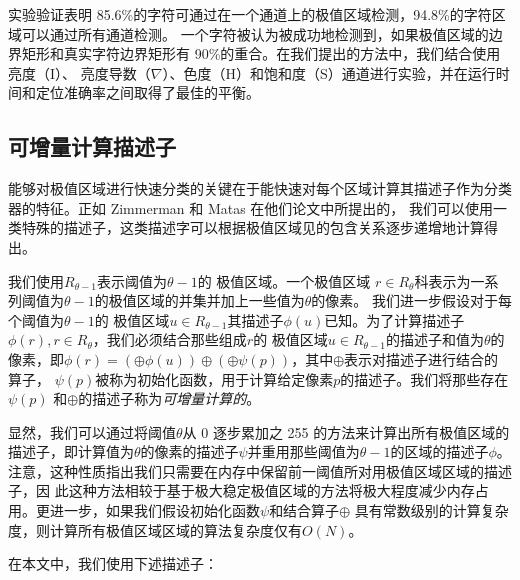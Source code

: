 \documentclass[UTF8]{ctexart}
\begin{document}
实验验证表明 85.6\%的字符可通过在一个通道上的极值区域检测，94.8\%的字符区域可以通过所有通道检测。
一个字符被认为被成功地检测到，如果极值区域的边界矩形和真实字符边界矩形有 90\%的重合。在我们提出的方法中，我们结合使用亮度（I）、
亮度导数（$\nabla$）、色度（H）和饱和度（S）通道进行实验，并在运行时间和定位准确率之间取得了最佳的平衡。

\subsection{可增量计算描述子}

能够对极值区域进行快速分类的关键在于能快速对每个区域计算其描述子作为分类器的特征。正如 Zimmerman 和 Matas 在他们论文中所提出的，
我们可以使用一类特殊的描述子，这类描述字可以根据极值区域见的包含关系逐步递增地计算得出。

我们使用$R_{\theta-1}$表示阈值为$\theta-1$的 极值区域。一个极值区域 $r \in R_{\theta}$科表示为一系列阈值为$\theta-1$的极值区域的并集并加上一些值为$\theta$的像素。
我们进一步假设对于每个阈值为$\theta-1$的 极值区域$u \in R_{\theta-1}$其描述子$\phi(u)$已知。为了计算描述子$\phi(r), r \in R_{\theta}$，我们必须结合那些组成$r$的
极值区域$u \in R_{\theta-1}$的描述子和值为$\theta$的像素，即$\phi(r) = \left( \oplus{\phi(u)} \right) \oplus \left( \oplus{\psi(p)} \right)$，其中$\oplus$表示对描述子进行结合的算子，
$\psi(p)$被称为初始化函数，用于计算给定像素$p$的描述子。我们将那些存在$\psi(p)$
和$\oplus$的描述子称为\textit{可增量计算的}。

显然，我们可以通过将阈值$\theta$从 0 逐步累加之 255 的方法来计算出所有极值区域的描述子，即计算值为$\theta$的像素的描述子$\psi$并重用那些阈值为$\theta-1$的区域的描述子$\phi$。
注意，这种性质指出我们只需要在内存中保留前一阈值所对用极值区域区域的描述子，因
此这种方法相较于基于极大稳定极值区域的方法将极大程度减少内存占用。更进一步，如果我们假设初始化函数$\psi$和结合算子$\oplus$
具有常数级别的计算复杂度，则计算所有极值区域区域的算法复杂度仅有$O(N)$。

在本文中，我们使用下述描述子： 
\end{document}
